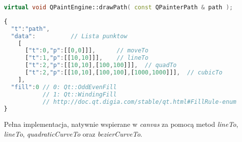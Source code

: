 \begin{lstlisting}[language=C++,numbers=none]
virtual void QPaintEngine::drawPath( const QPainterPath & path );
\end{lstlisting}
\begin{lstlisting}[language=JavaScript,numbers=none]
{
  "t":"path",
  "data":          // Lista punktow
    [
      ["t":0,"p":[[0,0]]],      // moveTo
      ["t":1,"p":[[10,10]]],    // lineTo
      ["t":2,"p":[[10,10],[100,100]]],  // quadTo
      ["t":2,"p":[[10,10],[100,100],[1000,1000]]],  // cubicTo
    ],
  "fill":0 // 0: Qt::OddEvenFill
           // 1: Qt::WindingFill
           // http://doc.qt.digia.com/stable/qt.html#FillRule-enum
}
\end{lstlisting}

Pełna implementacja, natywnie wspierane w \emph{canvas} za pomocą metod \emph{lineTo}, \emph{lineTo}, \emph{quadraticCurveTo} oraz \emph{bezierCurveTo}.